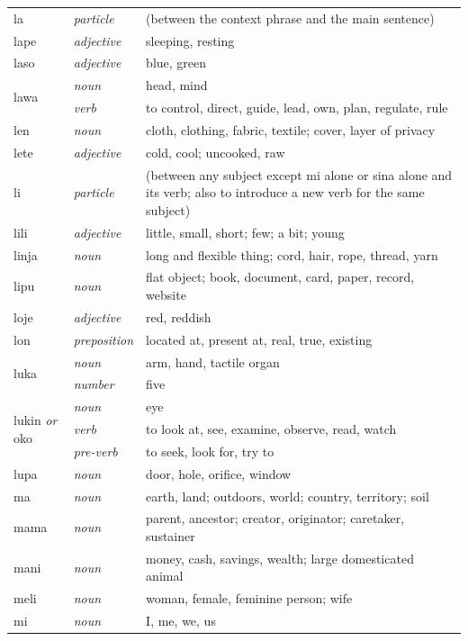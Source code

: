 \documentclass[14pt, a4paper]{extreport}
\begin{document}
\begin{longtable}{llp{10cm}}
  la & \textit{particle} & (between the context phrase and the main sentence) \\
  lape & \textit{adjective} & sleeping, resting \\
  laso & \textit{adjective} & blue, green \\
  \multirow[t]{2}{*}{lawa} & \textit{noun} & head, mind \\
  & \textit{verb} & to control, direct, guide, lead, own, plan, regulate, rule \\
  len & \textit{noun} & cloth, clothing, fabric, textile; cover, layer of privacy \\
  lete & \textit{adjective} & cold, cool; uncooked, raw \\
  li & \textit{particle} & (between any subject except mi alone or sina alone and its verb; also to introduce a new verb for the same subject) \\
  lili & \textit{adjective} & little, small, short; few; a bit; young \\
  linja & \textit{noun} & long and flexible thing; cord, hair, rope, thread, yarn \\
  lipu & \textit{noun} & flat object; book, document, card, paper, record, website \\
  loje & \textit{adjective} & red, reddish \\
  lon & \textit{preposition} & located at, present at, real, true, existing \\
  \multirow[t]{2}{*}{luka} & \textit{noun} & arm, hand, tactile organ \\
  & \textit{number} & five \\
  \multirow[t]{3}{*}{lukin \textit{or} oko} & \textit{noun} & eye \\
  & \textit{verb} & to look at, see, examine, observe, read, watch \\
  & \textit{pre-verb} & to seek, look for, try to \\
  lupa & \textit{noun} & door, hole, orifice, window \\
  ma & \textit{noun} & earth, land; outdoors, world; country, territory; soil \\
  mama & \textit{noun} & parent, ancestor; creator, originator; caretaker, sustainer \\
  mani & \textit{noun} & money, cash, savings, wealth; large domesticated animal \\
  meli & \textit{noun} & woman, female, feminine person; wife \\
  mi & \textit{noun} & I, me, we, us \\

\end{longtable}
\end{document}
